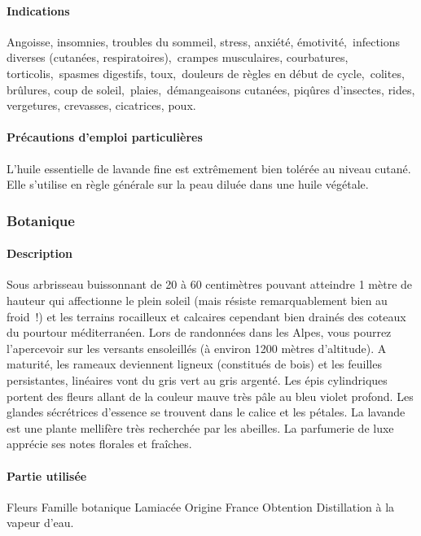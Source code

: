 \documentclass[12pt,a4wide]{article}
\begin{document}
\paragraph{Indications}
\label{sec-4-8-1-3}
Angoisse, insomnies, troubles du sommeil, stress, anxiété, émotivité, infections diverses (cutanées, respiratoires), crampes musculaires, courbatures, torticolis, spasmes digestifs, toux, douleurs de règles en début de cycle, colites, brûlures, coup de soleil, plaies, démangeaisons cutanées, piqûres d'insectes, rides, vergetures, crevasses, cicatrices, poux.

\paragraph{Précautions d'emploi particulières}
\label{sec-4-8-1-4}
L'huile essentielle de lavande fine est extrêmement bien tolérée au niveau cutané. Elle s'utilise en règle générale sur la peau diluée dans une huile végétale.

\subsubsection{Botanique}
\label{sec-4-8-2}
\paragraph{Description}
\label{sec-4-8-2-1}
Sous arbrisseau buissonnant de 20 à 60 centimètres pouvant atteindre 1 mètre de hauteur qui affectionne le plein soleil (mais résiste remarquablement bien au froid !) et les terrains rocailleux et calcaires cependant bien drainés des coteaux du pourtour méditerranéen. Lors de randonnées dans les Alpes, vous pourrez l'apercevoir sur les versants ensoleillés (à environ 1200 mètres d'altitude). A maturité, les rameaux deviennent ligneux (constitués de bois) et les feuilles persistantes, linéaires vont du gris vert au gris argenté. Les épis cylindriques portent des fleurs allant de la couleur mauve très pâle au bleu violet profond. Les glandes sécrétrices d'essence se trouvent dans le calice et les pétales. La lavande est une plante mellifère très recherchée par les abeilles. La parfumerie de luxe apprécie ses notes florales et fraîches.
\paragraph{Partie utilisée}
\label{sec-4-8-2-2}
Fleurs
Famille botanique                
Lamiacée
Origine
France
Obtention
Distillation à la vapeur d'eau.
\end{document}
